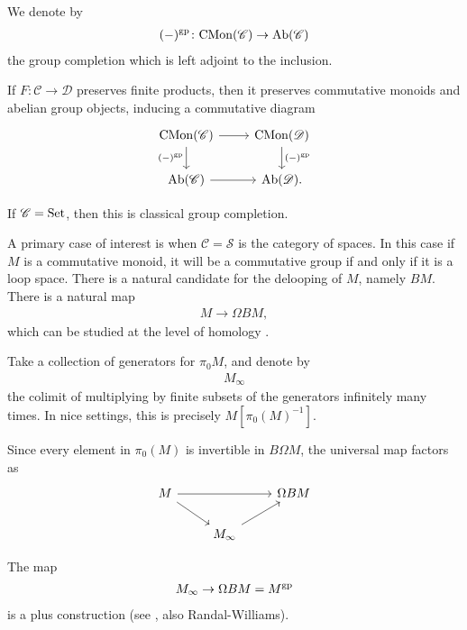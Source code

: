 \documentclass[11pt,openany]{book}
\begin{document}
We denote by
\begin{align*}
    (-)^{\mathrm{gp}} \colon \mathrm{CMon}(\mathscr{C}) \to \mathrm{Ab}(\mathscr{C})
\end{align*}
the group completion which is left adjoint to the inclusion.

\begin{proposition} If $F \colon \mathscr{C} \to \mathscr{D}$ preserves finite products, then it preserves commutative monoids and abelian group objects, inducing a commutative diagram
\[\begin{tikzcd}
    \CMon(\mathscr{C})\rar\dar["{(-)^\gp}" left] & \CMon(\mathscr{D})\dar["{(-)^\gp}" right]\\
    \Ab(\mathscr{C})\rar & \Ab(\mathscr{D}).
\end{tikzcd} \]
\end{proposition}


\begin{example} If $\mathscr{C} = \mathrm{Set}$, then this is classical group completion.
\end{example}

A primary case of interest is when $\mathscr{C} = \mathcal{S}$ is the category of spaces. In this case if $M$ is a commutative monoid, it will be a commutative group if and only if it is a loop space. There is a natural candidate for the delooping of $M$, namely $BM$. There is a natural map
\begin{align*}
    M \to \Omega BM,
\end{align*}
which can be studied at the level of homology \cite{McDuffSegal,Nikolaus-gp}.

\begin{definition} Take a collection of generators for $\pi_0 M$, and denote by
\begin{align*}
    M_\infty
\end{align*}
the colimit of multiplying by finite subsets of the generators infinitely many times. In nice settings, this is precisely $M \left[ \pi_0(M)^{-1} \right]$.
\end{definition}

Since every element in $\pi_0(M)$ is invertible in $B\Omega M$, the universal map factors as
\[ \begin{tikzcd}
    M\ar[rr]\ar[dr] &  & \Omega B M\\
     & M_\infty\ar[ur] & 
\end{tikzcd} \]

\begin{theorem} The map
\begin{align*}
    M_\infty \to \Omega BM = M^{\mathrm{gp}}
\end{align*}
is a plus construction (see \cite[Theorem~9]{Nikolaus-gp}, also Randal-Williams).
\end{theorem}
\end{document}
